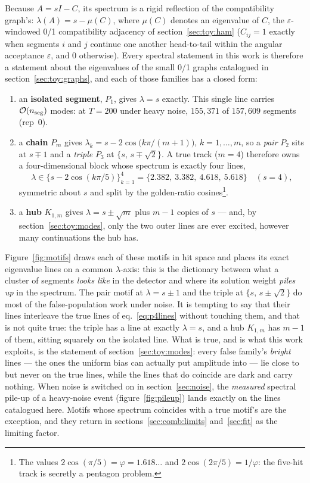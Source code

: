 \documentclass[11pt,a4paper]{article}
\begin{document}
Because $A=sI-C$, its spectrum is a rigid reflection of the
compatibility graph's: $\lambda(A)=s-\mu(C)$, where $\mu(C)$ denotes an
eigenvalue of $C$, the $\varepsilon$-windowed 0/1 compatibility
adjacency of section~\ref{sec:toy:ham} ($C_{ij}=1$ exactly when
segments $i$ and $j$ continue one another head-to-tail within the
angular acceptance $\varepsilon$, and $0$ otherwise). Every spectral
statement in this work is therefore a statement about the eigenvalues
of the small 0/1 graphs catalogued in section~\ref{sec:toy:graphs}, and
each of those families has a closed form:
\begin{enumerate}[leftmargin=2em]
\item an \textbf{isolated segment}, $P_1$, gives $\lambda=s$ exactly. This
single line carries $\mathcal{O}(n_{\rm seg})$ modes: at $T=200$ under
heavy noise, $155{,}371$ of $157{,}609$ segments (rep~0).
\item a \textbf{chain} $P_m$ gives
$\lambda_k=s-2\cos\!\big(k\pi/(m{+}1)\big)$, $k=1,\dots,m$, so a
\emph{pair} $P_2$ sits at $s\mp1$ and a \emph{triple} $P_3$ at
$\{s,\,s\mp\sqrt2\}$. A true track ($m=4$) therefore owns a
four-dimensional block whose spectrum is exactly four lines,
\begin{equation}
\lambda\in\{s-2\cos(k\pi/5)\}_{k=1}^{4}
=\{2.382,\ 3.382,\ 4.618,\ 5.618\}\quad(s=4),
\label{eq:p4lines}
\end{equation}
symmetric about $s$ and split by the golden-ratio
cosines\footnote{The values $2\cos(\pi/5)=\varphi=1.618\dots$ and
$2\cos(2\pi/5)=1/\varphi$: the five-hit track is secretly a pentagon
problem.}.
\item a \textbf{hub} $K_{1,m}$ gives $\lambda=s\pm\sqrt m$ plus
$m{-}1$ copies of $s$ --- and, by section~\ref{sec:toy:modes}, only the two
outer lines are ever excited, however many continuations the hub has.
\end{enumerate}
Figure~\ref{fig:motifs} draws each of these motifs in hit space and
places its exact eigenvalue lines on a common $\lambda$-axis: this is
the dictionary between what a cluster of segments \emph{looks like} in
the detector and where its solution weight \emph{piles up} in the
spectrum. The pair motif at $\lambda=s\pm1$ and the triple at
$\{s,\,s\pm\sqrt2\}$ do most of the false-population work under noise.
It is tempting to say that their lines interleave the true lines of
eq.~\eqref{eq:p4lines} without touching them, and that is not quite true: the
triple has a line at exactly $\lambda=s$, and a hub $K_{1,m}$ has $m-1$ of
them, sitting squarely on the isolated line. What is true, and is what this
work exploits, is the statement of section~\ref{sec:toy:modes}: every false
family's \emph{bright} lines --- the ones the uniform bias can actually put
amplitude into --- lie close to but never on the true lines, while the lines
that do coincide are dark and carry nothing. When noise is switched on in
section~\ref{sec:noise}, the \emph{measured} spectral pile-up of a
heavy-noise event (figure~\ref{fig:pileup}) lands exactly on the lines
catalogued here. Motifs whose spectrum coincides
with a true motif's are the exception, and they return in
sections~\ref{sec:comb:limits} and~\ref{sec:fit} as the limiting factor.
\end{document}
